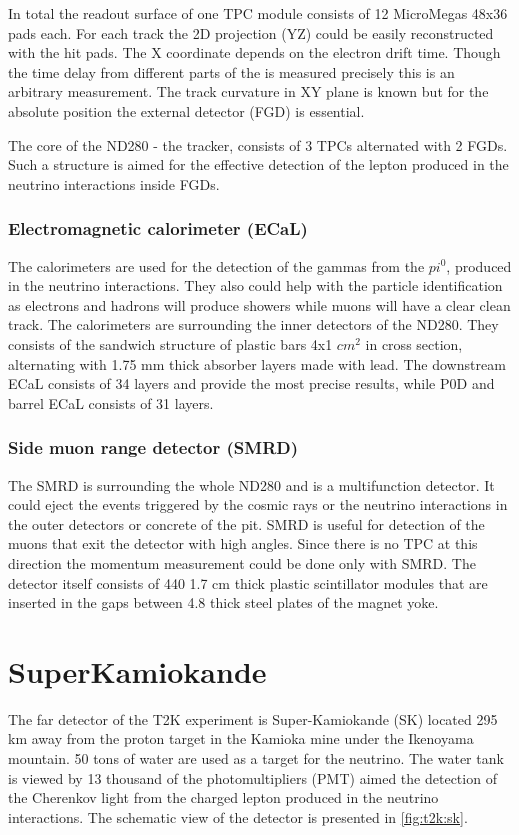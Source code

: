 \documentclass[../main.tex]{subfiles}
\begin{document}
In total the readout surface of one TPC module consists of 12 MicroMegas 48x36 pads each. For each track the 2D projection (YZ) could be easily reconstructed with the hit pads. The X coordinate depends on the electron drift time. Though the time delay from different parts of the is measured precisely this is an arbitrary measurement. The track curvature in XY plane is known but for the absolute position the external detector (FGD) is essential.

The core of the ND280 - the tracker, consists of 3 TPCs alternated with 2 FGDs. Such a structure is aimed for the effective detection of the lepton produced in the neutrino interactions inside FGDs.

\subsubsection{Electromagnetic calorimeter (ECaL)}
The calorimeters are used for the detection of the gammas from the $pi^0$, produced in the neutrino interactions. They also could help with the particle identification as electrons and hadrons will produce showers while muons will have a clear clean track. The calorimeters are surrounding the inner detectors of the ND280. They consists of the sandwich structure of plastic bars 4x1 $cm^2$ in cross section, alternating with 1.75 mm thick absorber layers made with lead. The downstream ECaL consists of 34 layers and provide the most precise results, while P0D and barrel ECaL consists of 31 layers.

\subsubsection{Side muon range detector (SMRD)}
The SMRD is surrounding the whole ND280 and is a multifunction detector. It could eject the events triggered by the cosmic rays or the neutrino interactions in the outer detectors or concrete of the pit. SMRD is useful for detection of the muons that exit the detector with high angles. Since there is no TPC at this direction the momentum measurement could be done only with SMRD. The detector itself consists of 440 1.7 cm thick plastic scintillator modules that are inserted in the gaps between 4.8 thick steel plates of the magnet yoke.


\section{SuperKamiokande}
\label{ch:T2K:sk}
The far detector of the T2K experiment is Super-Kamiokande (SK) located 295 km away from the proton target in the Kamioka mine under the Ikenoyama mountain. 50 tons of water are used as a target for the neutrino. The water tank is viewed by 13 thousand of the photomultipliers (PMT) aimed the detection of the Cherenkov light from the charged lepton produced in the neutrino interactions. The schematic view of the detector is presented in \autoref{fig:t2k:sk}.
\end{document}
